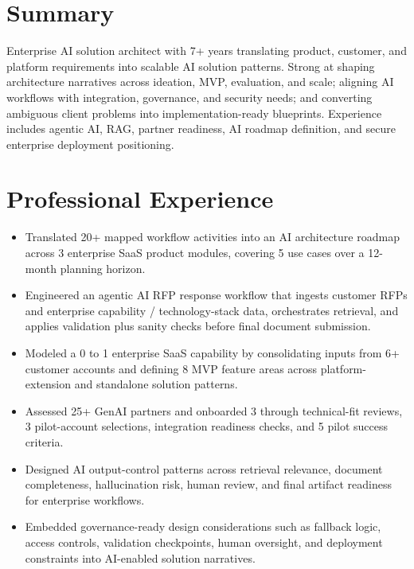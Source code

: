 \documentclass[10pt]{article}
\begin{document}
\fontsize{9.8pt}{11.7pt}\selectfont


\section{Summary}
Enterprise AI solution architect with 7+ years translating product, customer, and platform requirements into scalable AI solution patterns. Strong at shaping architecture narratives across ideation, MVP, evaluation, and scale; aligning AI workflows with integration, governance, and security needs; and converting ambiguous client problems into implementation-ready blueprints. Experience includes agentic AI, RAG, partner readiness, AI roadmap definition, and secure enterprise deployment positioning.

\section{Professional Experience}
\begin{itemize}
  \item Translated 20+ mapped workflow activities into an AI architecture roadmap across 3 enterprise SaaS product modules, covering 5 use cases over a 12-month planning horizon.
  \item Engineered an agentic AI RFP response workflow that ingests customer RFPs and enterprise capability / technology-stack data, orchestrates retrieval, and applies validation plus sanity checks before final document submission.
  \item Modeled a 0 to 1 enterprise SaaS capability by consolidating inputs from 6+ customer accounts and defining 8 MVP feature areas across platform-extension and standalone solution patterns.
  \item Assessed 25+ GenAI partners and onboarded 3 through technical-fit reviews, 3 pilot-account selections, integration readiness checks, and 5 pilot success criteria.
  \item Designed AI output-control patterns across retrieval relevance, document completeness, hallucination risk, human review, and final artifact readiness for enterprise workflows.
  \item Embedded governance-ready design considerations such as fallback logic, access controls, validation checkpoints, human oversight, and deployment constraints into AI-enabled solution narratives.
\end{itemize}
\end{document}
